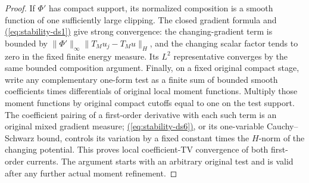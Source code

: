 \documentclass[11pt,reqno]{amsart}
\theoremstyle{definition}
\theoremstyle{remark}
\numberwithin{equation}{section}
\newcommand{\MathEqref}[1]{\begingroup\hypersetup{linkcolor=EquationLink}\hyperref[#1]{(\ref*{#1})}\endgroup}
\begin{document}
\begin{proof}
If $\Phi'$ has compact support, its normalized composition is
a smooth function of one sufficiently large clipping.  The
closed gradient formula and \MathEqref{eq:stability-ds1} give strong convergence:
the changing-gradient term is bounded by
$\|\Phi'\|_\infty\|T_Mu_j-T_Mu\|_H$, and the
changing scalar factor tends to zero in the fixed finite
energy measure.  Its $L^2$ representative converges by the
same bounded composition argument.  Finally, on a fixed
original compact stage, write any complementary one-form
test as a finite sum of bounded smooth coefficients times
differentials of original local moment functions.  Multiply
those moment functions by original compact cutoffs equal to
one on the test support.  The coefficient pairing of a
first-order derivative with each such term is an original
mixed gradient measure; \MathEqref{eq:stability-ds6}, or its one-variable
Cauchy--Schwarz bound, controls its variation by a fixed
constant times the $H$-norm of the changing potential.
This proves local coefficient-TV convergence of both first-order
currents.  The argument starts with an arbitrary original test
and is valid after any further actual moment refinement.

\end{proof}


\end{document}
